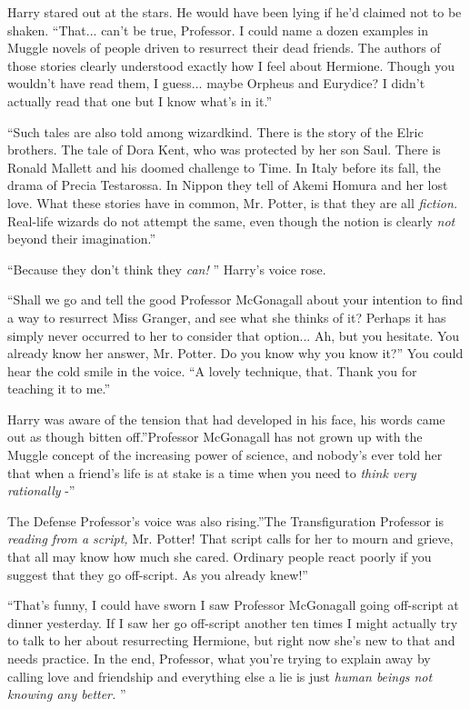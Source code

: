 Harry stared out at the stars. He would have been lying if he'd claimed
not to be shaken. ``That... can't be true, Professor. I could name
a dozen examples in Muggle novels of people driven to resurrect their
dead friends. The authors of those stories clearly understood exactly
how I feel about Hermione. Though you wouldn't have read them, I
guess... maybe Orpheus and Eurydice? I didn't actually read that
one but I know what's in it.''

``Such tales are also told among wizardkind. There is the story of the
Elric brothers. The tale of Dora Kent, who was protected by her son
Saul. There is Ronald Mallett and his doomed challenge to Time. In Italy
before its fall, the drama of Precia Testarossa. In Nippon they tell of
Akemi Homura and her lost love. What these stories have in common, Mr.
Potter, is that they are all \emph{fiction.} Real-life wizards do not
attempt the same, even though the notion is clearly \emph{not} beyond
their imagination.''

``Because they don't think they \emph{can!} '' Harry's voice rose.

``Shall we go and tell the good Professor McGonagall about your
intention to find a way to resurrect Miss Granger, and see what she
thinks of it? Perhaps it has simply never occurred to her to consider
that option... Ah, but you hesitate. You already know her answer,
Mr. Potter. Do you know why you know it?'' You could hear the cold smile
in the voice. ``A lovely technique, that. Thank you for teaching it to
me.''

Harry was aware of the tension that had developed in his face, his words
came out as though bitten off.''Professor McGonagall has not grown up
with the Muggle concept of the increasing power of science, and nobody's
ever told her that when a friend's life is at stake is a time when you
need to \emph{think very rationally} -''

The Defense Professor's voice was also rising.''The Transfiguration
Professor is \emph{reading from a script,} Mr. Potter! That script calls
for her to mourn and grieve, that all may know how much she cared.
Ordinary people react poorly if you suggest that they go off-script. As
you already knew!''

``That's funny, I could have sworn I saw Professor McGonagall going
off-script at dinner yesterday. If I saw her go off-script another ten
times I might actually try to talk to her about resurrecting Hermione,
but right now she's new to that and needs practice. In the end,
Professor, what you're trying to explain away by calling love and
friendship and everything else a lie is just \emph{human beings not
knowing any better.} ''

